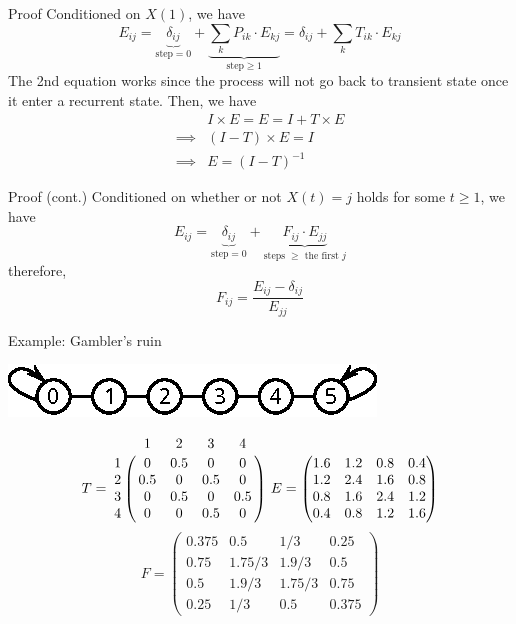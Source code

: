 \documentclass[mathserif]{beamer}
\begin{document}
\begin{frame}{Proof}
Conditioned on $X(1)$, we have
\[
E_{ij} = \underbrace{\delta_{ij}}_{\text{step} = 0} + 
	\underbrace{\sum_k P_{ik} \cdot E_{kj}}_{\text{step} \geq 1}
	= \delta_{ij} + \sum_k T_{ik} \cdot E_{kj}
\]
The 2nd equation works since the process will not go back to transient state once it enter a recurrent state.
Then, we have
\begin{align*}
& I \times E = E = I + T \times E \\
\implies & (I - T) \times E = I \\
\implies & E = (I - T)^{-1}
\end{align*}
\end{frame}

\begin{frame}{Proof (cont.)}
Conditioned on whether or not $X(t) = j$ holds for some $t \geq 1$, we have
\[
E_{ij} = \underbrace{\delta_{ij}}_{\text{step} = 0} + 
	\underbrace{F_{ij} \cdot E_{jj}}_{\text{steps $\geq$ the first $j$}}
\]
therefore,
\[
F_{ij} = \frac{E_{ij} - \delta_{ij}}{E_{jj}}
\]
\end{frame}

\begin{frame}{Example: Gambler's ruin}
\begin{center}
\includegraphics[scale=1.5]{gambler_line}
\end{center}
\[
T = \bordermatrix{~ & 1   & 2   & 3   & 4 \cr
                  1 & 0   & 0.5 & 0   & 0 \cr
                  2 & 0.5 & 0   & 0.5 & 0 \cr
                  3 & 0   & 0.5 & 0   & 0.5 \cr
                  4 & 0   & 0   & 0.5 & 0 \cr}
~E = \begin{pmatrix}
1.6 & 1.2 & 0.8 & 0.4 \\
1.2 & 2.4 & 1.6 & 0.8 \\
0.8 & 1.6 & 2.4 & 1.2 \\
0.4 & 0.8 & 1.2 & 1.6
\end{pmatrix}
\]
\[
F = \begin{pmatrix}
0.375 & 0.5 & 1/3 & 0.25 \\
0.75 & 1.75/3 & 1.9/3 & 0.5 \\
0.5 & 1.9/3 & 1.75/3 & 0.75 \\
0.25 & 1/3 & 0.5 & 0.375
\end{pmatrix}
\]
\end{frame}
\end{document}
